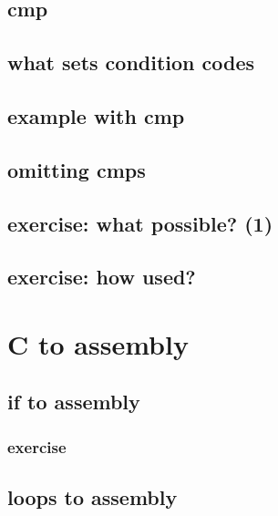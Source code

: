 

\subsection{cmp}


\subsection{what sets condition codes}


\subsection{example with cmp}


\subsection{omitting cmps}


\subsection{exercise: what possible? (1)}


\subsection{exercise: how used?}



\section{C to assembly}

\subsection{if to assembly}



\subsubsection{exercise}



\subsection{loops to assembly}


